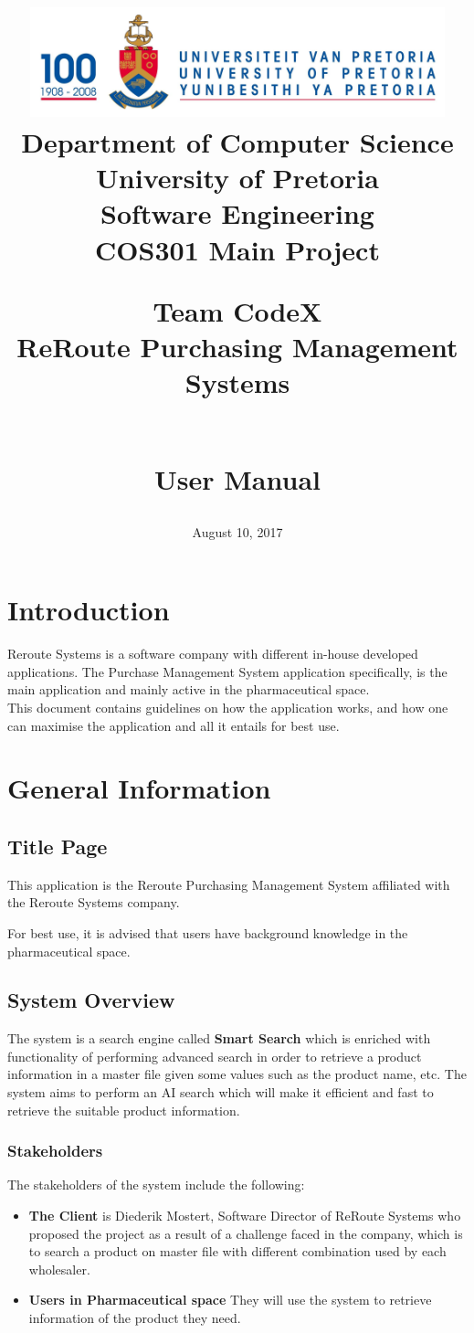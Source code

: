 \documentclass[a4paper,10pt]{article}
\title{\includegraphics[width=12cm]{Eeufeeslogo.jpg} \\
       Department of Computer Science \\
       University of Pretoria \\
       \vspace{0.5cm}
       Software Engineering\\
       COS301 Main Project \\
       \vspace{1.0cm}
       \begin{large} \textbf{Team CodeX}\\ ReRoute Purchasing Management Systems\end{large}\\
       \vspace{1.0cm}
       User Manual \\}
\date{August 10, 2017}
\author{}
\begin{document}
\maketitle
\thispagestyle{empty}
\clearpage

\newpage
{}
\thispagestyle{empty}
\tableofcontents
\clearpage

\newpage
{}

\section{Introduction}
Reroute Systems is a software company with different in-house developed applications. The Purchase Management System 
application specifically, is the main application and mainly active in the pharmaceutical space.\\
This document contains guidelines on how the application works, and how one can maximise the application and all it entails for best use.\\

\section{General Information}
\subsection{Title Page}
This application is the Reroute Purchasing Management System affiliated with the Reroute Systems company.\

For best use, it is advised that users have background knowledge in the pharmaceutical space.\\

\subsection{System Overview}
The system is a search engine called \textbf{Smart Search} which is enriched with functionality of performing advanced search in order to retrieve a product information in a master file given some values such as the product name, etc. The system aims to perform an AI search which will make it efficient and fast to retrieve the suitable product information. \\
	
	\subsubsection{Stakeholders}
	The stakeholders of the system include the following:
	\begin{itemize}
	\item \textbf{The Client} is Diederik Mostert, Software Director of ReRoute Systems who proposed the project as a result of a challenge faced in the company, which is to search a product on master file with different combination used by each wholesaler.
	\item \textbf{Users in Pharmaceutical space} They will use the system to retrieve information of the product they need.
	\end{itemize}
\end{document}
